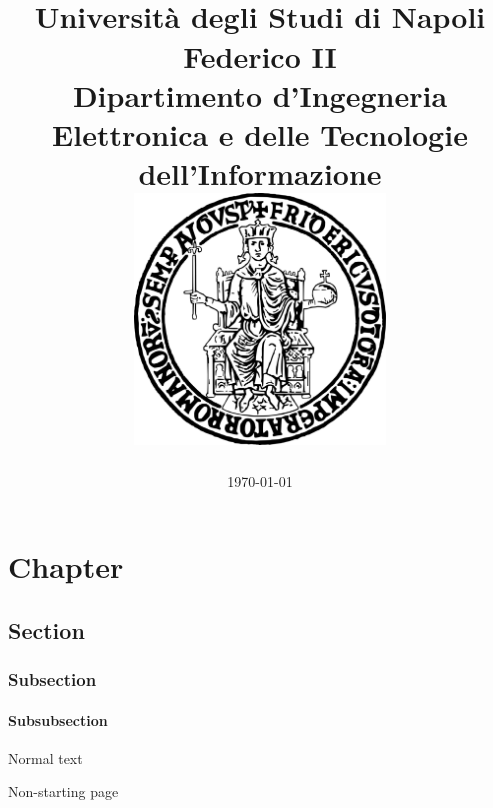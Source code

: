 \documentclass[14pt, twoside]{extreport}
\title{
    \color{PRIMARY}\maintitle \\
    \color{SECONDARY}\large Università degli Studi di Napoli Federico II \\
    \normalsize Dipartimento d'Ingegneria Elettronica e delle Tecnologie dell'Informazione \\
    \includegraphics[width=0.5\textwidth]{uni_logo.pdf}
    }
\author{\color{PRIMARY}\authors}
\date{\color{SECONDARY}\today}
\begin{document}
\pagecolor{TERTIARY}\afterpage{\nopagecolor}
\maketitle

\tableofcontents


\chapter{Chapter}
\section{Section}
\subsection{Subsection}
\subsubsection{Subsubsection}
Normal text

\newpage

Non-starting page
\end{document}
